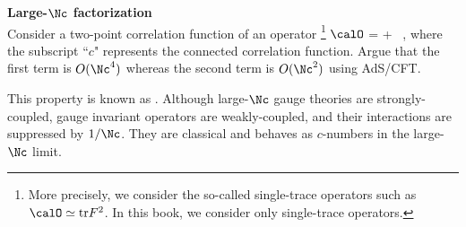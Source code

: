 \begin{prob}
\label{prob:factorization}
\textbf{Large-$\Nc$ factorization}\\
Consider a two-point correlation function of an operator%
\footnote{More precisely, we consider the so-called single-trace operators such as $\calO \simeq \text{tr} F^2$. In this book, we consider only single-trace operators.} 
$\calO$
\be
%
\bra \calO\calO \ket = \bra\calO\ket \bra\calO\ket + \bra \calO\calO \ketc~,
%
\ee
where the subscript ``$c$" represents the connected correlation function. Argue that the first term is $O(\Nc^4)$ whereas the second term is $O(\Nc^2)$ using AdS/CFT. 

This property is known as . Although large-$\Nc$ gauge theories are strongly-coupled, gauge invariant operators are weakly-coupled, and their interactions are suppressed by $1/\Nc$. They are classical and behaves as $c$-numbers in the large-$\Nc$ limit.
\end{prob}

\newcommand{\Sosd}{\underline{I}}

